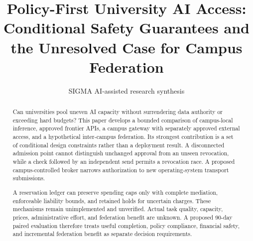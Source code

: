 \documentclass[11pt]{article}
\title{Policy-First University AI Access: Conditional Safety Guarantees and the Unresolved Case for Campus Federation}
\date{}
\author{SIGMA AI-assisted research synthesis}
\begin{document}
\maketitle

\begin{abstract}
Can universities pool uneven AI capacity without surrendering data authority or exceeding hard budgets? This paper develops a bounded comparison of campus-local inference, approved frontier APIs, a campus gateway with separately approved external access, and a hypothetical inter-campus federation. Its strongest contribution is a set of conditional design constraints rather than a deployment result. A disconnected admission point cannot distinguish unchanged approval from an unseen revocation, while a check followed by an independent send permits a revocation race. A proposed campus-controlled broker narrows authorization to new operating-system transport submissions.

A reservation ledger can preserve spending caps only with complete mediation, enforceable liability bounds, and retained holds for uncertain charges. These mechanisms remain unimplemented and unverified. Actual task quality, capacity, prices, administrative effort, and federation benefit are unknown. A proposed 90-day paired evaluation therefore treats useful completion, policy compliance, financial safety, and incremental federation benefit as separate decision requirements.
\end{abstract}
\begingroup\setlength{\fboxsep}{10pt}
\noindent{}\endgroup\par\medskip
\end{document}
